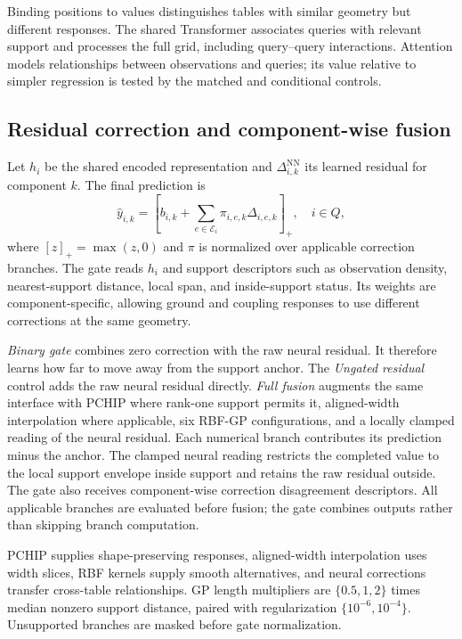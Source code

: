 \documentclass[conference,10pt,letterpaper]{IEEEtran}
\begin{document}
Binding positions to values distinguishes tables with similar geometry but different responses. The shared Transformer associates queries with relevant support and processes the full grid, including query--query interactions. Attention models relationships between observations and queries; its value relative to simpler regression is tested by the matched and conditional controls.

\subsection{Residual correction and component-wise fusion}
Let $h_i$ be the shared encoded representation and $\Delta^{\mathrm{NN}}_{i,k}$ its learned residual for component $k$. The final prediction is
\begin{equation}
\widehat y_{i,k}=\left[b_{i,k}+\sum_{e\in\mathcal E_i}\pi_{i,e,k}\Delta_{i,e,k}\right]_+,\quad i\in Q,
\label{eq:prediction}
\end{equation}
where $[z]_+=\max(z,0)$ and $\pi$ is normalized over applicable correction branches. The gate reads $h_i$ and support descriptors such as observation density, nearest-support distance, local span, and inside-support status. Its weights are component-specific, allowing ground and coupling responses to use different corrections at the same geometry.

\emph{Binary gate} combines zero correction with the raw neural residual. It therefore learns how far to move away from the support anchor. The \emph{Ungated residual} control adds the raw neural residual directly. \emph{Full fusion} augments the same interface with PCHIP where rank-one support permits it, aligned-width interpolation where applicable, six RBF-GP configurations, and a locally clamped reading of the neural residual. Each numerical branch contributes its prediction minus the anchor. The clamped neural reading restricts the completed value to the local support envelope inside support and retains the raw residual outside. The gate also receives component-wise correction disagreement descriptors. All applicable branches are evaluated before fusion; the gate combines outputs rather than skipping branch computation.

PCHIP supplies shape-preserving responses, aligned-width interpolation uses width slices, RBF kernels supply smooth alternatives, and neural corrections transfer cross-table relationships. GP length multipliers are $\{0.5,1,2\}$ times median nonzero support distance, paired with regularization $\{10^{-6},10^{-4}\}$. Unsupported branches are masked before gate normalization.
\end{document}
